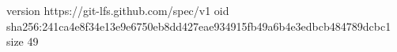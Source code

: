 version https://git-lfs.github.com/spec/v1
oid sha256:241ca4e8f34e13e9e6750eb8dd427eae934915fb49a6b4e3edbcb484789dcbc1
size 49
